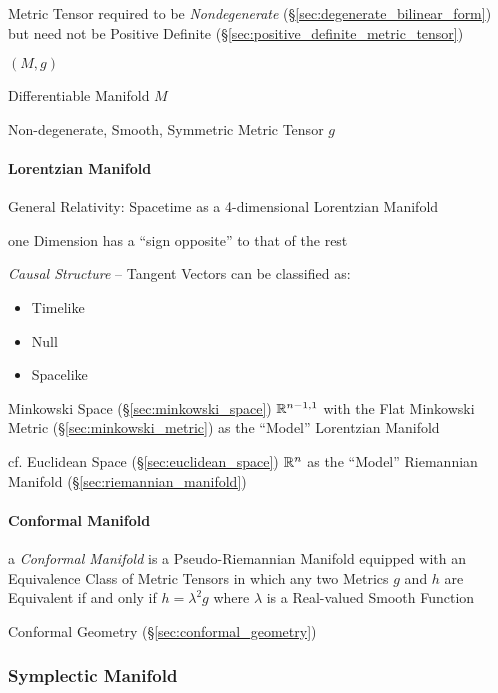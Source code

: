 Metric Tensor required to be \emph{Nondegenerate}
(\S\ref{sec:degenerate_bilinear_form}) but need not be Positive
Definite (\S\ref{sec:positive_definite_metric_tensor})

$(M,g)$

Differentiable Manifold $M$

Non-degenerate, Smooth, Symmetric Metric Tensor $g$



\paragraph{Lorentzian Manifold}\label{sec:lorentzian_manifold}\hfill

General Relativity: Spacetime as a 4-dimensional Lorentzian Manifold

one Dimension has a ``sign opposite'' to that of the rest

\emph{Causal Structure} -- Tangent Vectors can be classified as:
\begin{itemize}
  \item Timelike
  \item Null
  \item Spacelike
\end{itemize}

Minkowski Space (\S\ref{sec:minkowski_space}) $\mathbb{R}^{n-1,1}$
with the Flat Minkowski Metric (\S\ref{sec:minkowski_metric}) as the
``Model'' Lorentzian Manifold

cf. Euclidean Space (\S\ref{sec:euclidean_space}) $\mathbb{R}^n$ as the
``Model'' Riemannian Manifold (\S\ref{sec:riemannian_manifold})



\paragraph{Conformal Manifold}\label{sec:conformal_manifold}\hfill

a \emph{Conformal Manifold} is a Pseudo-Riemannian Manifold equipped with an
Equivalence Class of Metric Tensors in which any two Metrics $g$ and $h$ are
Equivalent if and only if $h = \lambda^2 g$ where $\lambda$ is a Real-valued
Smooth Function

\fist Conformal Geometry (\S\ref{sec:conformal_geometry})



\subsubsection{Symplectic Manifold}\label{sec:symplectic_manifold}

